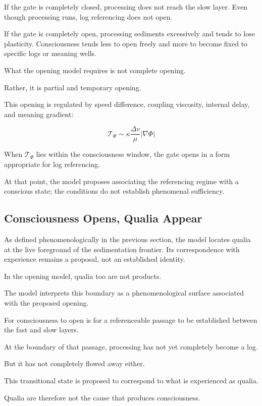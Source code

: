 If the gate is completely closed, processing does not reach the slow layer. Even though processing runs, log referencing does not open.

If the gate is completely open, processing sediments excessively and tends to lose plasticity. Consciousness tends less to open freely and more to become fixed to specific logs or meaning wells.

What the opening model requires is not complete opening.

Rather, it is partial and temporary opening.

This opening is regulated by speed difference, coupling viscosity, internal delay, and meaning gradient:

\begin{equation}
\mathcal{T}_{\Phi} \sim \kappa \frac{\Delta v}{\mu} |\nabla \Phi|
\end{equation}

When $\mathcal{T}_{\Phi}$ lies within the consciousness window, the gate opens in a form appropriate for log referencing.

At that point, the model proposes associating the referencing regime with a conscious state; the conditions do not establish phenomenal sufficiency.

\subsection{Consciousness Opens, Qualia Appear}


As defined phenomenologically in the previous section, the model locates qualia at the live foreground of the sedimentation frontier. Its correspondence with experience remains a proposal, not an established identity.

In the opening model, qualia too are not products.

The model interprets this boundary as a phenomenological surface associated with the proposed opening.

For consciousness to open is for a referenceable passage to be established between the fast and slow layers.

At the boundary of that passage, processing has not yet completely become a log.

But it has not completely flowed away either.

This transitional state is proposed to correspond to what is experienced as qualia.

Qualia are therefore not the cause that produces consciousness.

